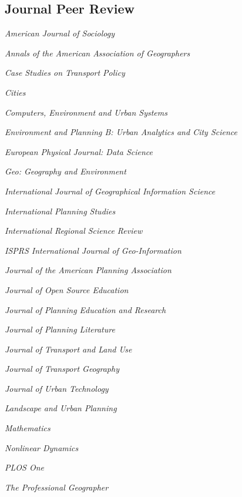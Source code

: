 \documentclass[12pt,letterpaper]{report}
\newcommand{\listitemspace}{0.15em}
\renewenvironment{itemize}
{\begin{list}{}{\setlength{\leftmargin}{0em}
            \setlength{\parskip}{0em}
            \setlength{\itemsep}{\listitemspace}
            \setlength{\parsep}{\listitemspace}}}
    {\end{list}}
\begin{document}
    \subsection*{Journal Peer Review}

    \begin{itemize}
        
        \item \textit{American Journal of Sociology}
        \item \textit{Annals of the American Association of Geographers}
        \item \textit{Case Studies on Transport Policy}
        \item \textit{Cities}
        \item \textit{Computers, Environment and Urban Systems}
        \item \textit{Environment and Planning B: Urban Analytics and City Science}
        \item \textit{European Physical Journal: Data Science}
        \item \textit{Geo: Geography and Environment}
        \item \textit{International Journal of Geographical Information Science}
        \item \textit{International Planning Studies}
        \item \textit{International Regional Science Review}
        \item \textit{ISPRS International Journal of Geo-Information}
        \item \textit{Journal of the American Planning Association}
        \item \textit{Journal of Open Source Education}        
        \item \textit{Journal of Planning Education and Research}
        \item \textit{Journal of Planning Literature}
        \item \textit{Journal of Transport and Land Use}
        \item \textit{Journal of Transport Geography}
        \item \textit{Journal of Urban Technology}
        \item \textit{Landscape and Urban Planning}
        \item \textit{Mathematics}
        \item \textit{Nonlinear Dynamics}
        \item \textit{PLOS One}
        \item \textit{The Professional Geographer}

\end{itemize}
\end{document}
